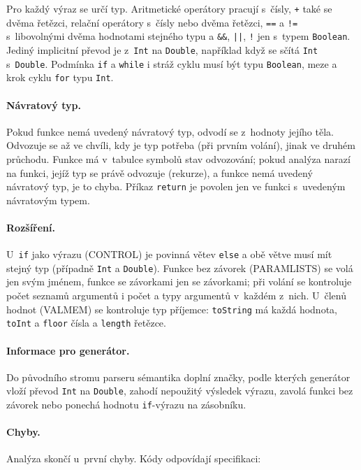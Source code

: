 \documentclass[11pt,a4paper]{article}
\begin{document}
Pro každý výraz se určí typ. Aritmetické operátory pracují s~čísly,
\texttt{+} také se dvěma řetězci, relační operátory s~čísly nebo dvěma
řetězci, \texttt{==} a \texttt{!=} s~libovolnými dvěma hodnotami stejného
typu a \texttt{\&\&}, \texttt{||}, \texttt{!} jen s~typem
\texttt{Boolean}. Jediný implicitní převod je z~\texttt{Int} na
\texttt{Double}, například když se sčítá \texttt{Int} s~\texttt{Double}.
Podmínka \texttt{if} a \texttt{while} i stráž cyklu musí být typu
\texttt{Boolean}, meze a krok cyklu \texttt{for} typu \texttt{Int}.

\paragraph{Návratový typ.}
Pokud funkce nemá uvedený návratový typ, odvodí se z~hodnoty jejího těla.
Odvozuje se až ve chvíli, kdy je typ potřeba (při prvním volání), jinak
ve druhém průchodu. Funkce má v~tabulce symbolů stav odvozování; pokud
analýza narazí na funkci, jejíž typ se právě odvozuje (rekurze), a funkce
nemá uvedený návratový typ, je to chyba. Příkaz \texttt{return} je
povolen jen ve funkci s~uvedeným návratovým typem.

\paragraph{Rozšíření.}
U~\texttt{if} jako výrazu (CONTROL) je povinná větev \texttt{else} a obě
větve musí mít stejný typ (případně \texttt{Int} a \texttt{Double}).
Funkce bez závorek (PARAMLISTS) se volá jen svým jménem, funkce se
závorkami jen se závorkami; při volání se kontroluje počet seznamů
argumentů i počet a typy argumentů v~každém z~nich. U~členů hodnot
(VALMEM) se kontroluje typ příjemce: \texttt{toString} má každá hodnota,
\texttt{toInt} a \texttt{floor} čísla a \texttt{length} řetězce.

\paragraph{Informace pro generátor.}
Do původního stromu parseru sémantika doplní značky, podle kterých
generátor vloží převod \texttt{Int} na \texttt{Double}, zahodí nepoužitý
výsledek výrazu, zavolá funkci bez závorek nebo ponechá hodnotu
\texttt{if}-výrazu na zásobníku.

\paragraph{Chyby.}
Analýza skončí u~první chyby. Kódy odpovídají specifikaci:
\end{document}
